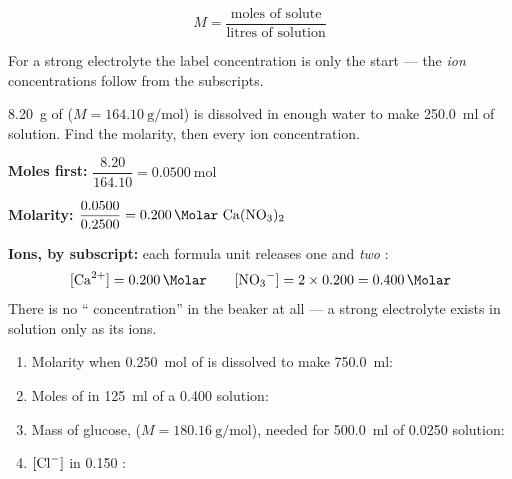 \documentclass{apchem-worksheet}
\begin{document}
\[ M = \frac{\text{moles of solute}}{\text{litres of solution}} \]

For a strong electrolyte the label concentration is only the start ---
the \emph{ion} concentrations follow from the subscripts.

\begin{workedexample}
\SI{8.20}{\gram} of  ($M = \SI{164.10}{\gram\per\mole}$) is
dissolved in enough water to make \SI{250.0}{\milli\litre} of solution.
Find the molarity, then every ion concentration.

\textbf{Moles first:}
$\dfrac{8.20}{164.10} = \SI{0.0500}{\mole}$

\textbf{Molarity:}
$\dfrac{0.0500}{0.2500} = \SI{0.200}{\Molar}~\ce{Ca(NO3)2}$

\textbf{Ions, by subscript:} each formula unit releases one 
and \emph{two} :
\[ [\ce{Ca^2+}] = \SI{0.200}{\Molar} \qquad
   [\ce{NO3-}] = 2 \times 0.200 = \SI{0.400}{\Molar} \]
There is no `` concentration'' in the beaker at all --- a
strong electrolyte exists in solution only as its ions.
\end{workedexample}

\begin{yourturn}
\begin{enumerate}[leftmargin=*,itemsep=0.5em]
  \item Molarity when \SI{0.250}{\mole} of  is dissolved to make
        \SI{750.0}{\milli\litre}: \workspace[1.4cm]
  \item Moles of  in \SI{125}{\milli\litre} of a
        \SI{0.400}{\Molar} solution: \workspace[1.4cm]
  \item Mass of glucose, 
        ($M = \SI{180.16}{\gram\per\mole}$), needed for
        \SI{500.0}{\milli\litre} of \SI{0.0250}{\Molar} solution:
        \workspace[1.8cm]
  \item $[\ce{Cl-}]$ in \SI{0.150}{\Molar} : \workspace[1.2cm]
\end{enumerate}
\end{yourturn}
\end{document}
